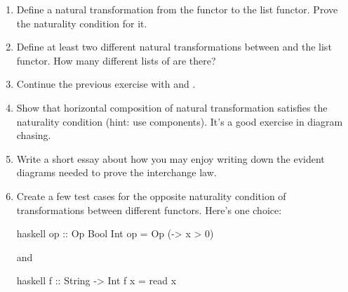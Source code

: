\begin{enumerate}
\tightlist
\item
  Define a natural transformation from the  functor to the
  list functor. Prove the naturality condition for it.
\item
  Define at least two different natural transformations between
   and the list functor. How many different lists of
  \code{()} are there?
\item
  Continue the previous exercise with  and
  .
\item
  Show that horizontal composition of natural transformation satisfies
  the naturality condition (hint: use components). It's a good exercise
  in diagram chasing.
\item
  Write a short essay about how you may enjoy writing down the evident
  diagrams needed to prove the interchange law.
\item
  Create a few test cases for the opposite naturality condition of
  transformations between different  functors. Here's one
  choice:

\begin{snip}{haskell}
op :: Op Bool Int
op = Op (\x -> x > 0)
\end{snip}
and

\begin{snip}{haskell}
f :: String -> Int
f x = read x
\end{snip}
\end{enumerate}
